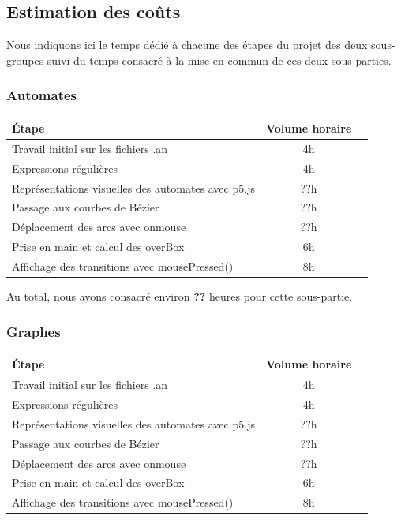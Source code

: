 
\subsection{Estimation des coûts}

Nous indiquons ici le temps dédié à chacune des étapes du projet des deux sous-groupes suivi du temps consacré à la mise en commun de ces deux sous-parties.

\subsubsection{Automates}

\begin{flushleft}
\begin{tabular}{|l|c|r|}
  \hline
   Étape & Volume horaire \\
  \hline
  Travail initial sur les fichiers .an & 4h \\
     \hline
  Expressions régulières & 4h \\
  \hline
  Représentations visuelles des automates avec p5.js & ??h\\
  \hline
    Passage aux courbes de Bézier & ??h \\
  \hline
    Déplacement des arcs avec onmouse & ??h\\
  \hline
   Prise en main et calcul des overBox  & 6h \\
  \hline
   Affichage des transitions avec mousePressed() & 8h \\
    \hline
 \end{tabular}
 \end{flushleft}

Au total, nous avons consacré environ \textbf{??} heures pour cette sous-partie. 

\subsubsection{Graphes}

\begin{flushleft}
\begin{tabular}{|l|c|r|}
  \hline
   Étape & Volume horaire \\
  \hline
  Travail initial sur les fichiers .an & 4h \\
     \hline
  Expressions régulières & 4h \\
  \hline
  Représentations visuelles des automates avec p5.js & ??h\\
  \hline
    Passage aux courbes de Bézier & ??h \\
  \hline
    Déplacement des arcs avec onmouse & ??h\\
  \hline
   Prise en main et calcul des overBox  & 6h \\
  \hline
   Affichage des transitions avec mousePressed() & 8h \\
    \hline
 \end{tabular}
 \end{flushleft}

